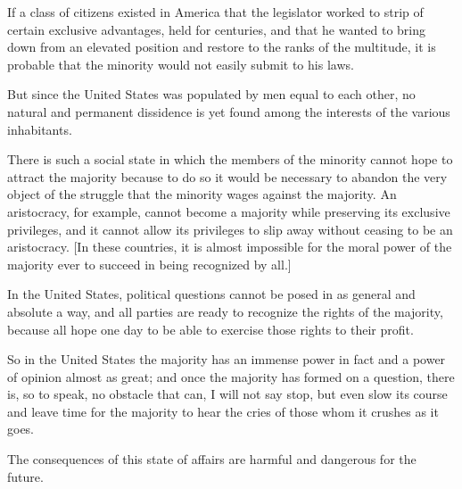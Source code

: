 If a class of citizens existed in America that the legislator worked to strip of certain exclusive advantages, held for centuries, and that he wanted to bring down from an elevated position and restore to the ranks of the multitude, it is probable that the minority would not easily submit to his laws.

But since the United States was populated by men equal to each other, no natural and permanent dissidence is yet found among the interests of the various inhabitants.

There is such a social state in which the members of the minority cannot hope to attract the majority because to do so it would be necessary to abandon the very object of the struggle that the minority wages against the majority. An aristocracy, for example, cannot become a majority while preserving its exclusive privileges, and it cannot allow its privileges to slip away without ceasing to be an aristocracy. [In these countries, it is almost impossible for the moral power of the majority ever to succeed in being recognized by all.]

In the United States, political questions cannot be posed in as general and absolute a way, and all parties are ready to recognize the rights of the majority, because all hope one day to be able to exercise those rights to their profit.

So in the United States the majority has an immense power in fact and a power of opinion almost as great; and once the majority has formed on a question, there is, so to speak, no obstacle that can, I will not say stop, but even slow its course and leave time for the majority to hear the cries of those whom it crushes as it goes.

The consequences of this state of affairs are harmful and dangerous for the future.